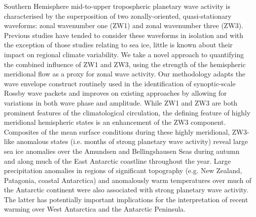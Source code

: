 Southern Hemisphere mid-to-upper tropospheric planetary wave activity is characterised by the superposition of two zonally-oriented, quasi-stationary waveforms: zonal wavenumber one (ZW1) and zonal wavenumber three (ZW3). Previous studies have tended to consider these waveforms in isolation and with the exception of those studies relating to sea ice, little is known about their impact on regional climate variability. We take a novel approach to quantifying the combined influence of ZW1 and ZW3, using the strength of the hemispheric meridional flow as a proxy for zonal wave activity. Our methodology adapts the wave envelope construct routinely used in the identification of synoptic-scale Rossby wave packets and improves on existing approaches by allowing for variations in both wave phase and amplitude. While ZW1 and ZW3 are both prominent features of the climatological circulation, the defining feature of highly meridional hemispheric states is an enhancement of the ZW3 component. Composites of the mean surface conditions during these highly meridional, ZW3-like anomalous states (i.e. months of strong planetary wave activity) reveal large sea ice anomalies over the Amundsen and Bellingshausen Seas during autumn and along much of the East Antarctic coastline throughout the year. Large precipitation anomalies in regions of significant topography (e.g. New Zealand, Patagonia, coastal Antarctica) and anomalously warm temperatures over much of the Antarctic continent were also associated with strong planetary wave activity. The latter has potentially important implications for the interpretation of recent warming over West Antarctica and the Antarctic Peninsula.

